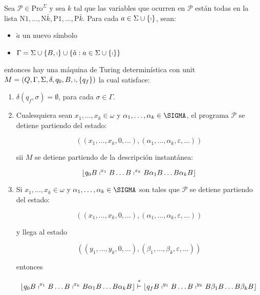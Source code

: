 	\begin{lemma}
		Sea $\mathcal{P}\in \mathrm{Pro}^{\Sigma }$ y sea $k$ tal que las variables que ocurren en $\mathcal{P}$ están todas
    en la lista $\mathrm{N}1, \dotsc, \mathrm{N}\bar{k}, \mathrm{P}1, \dotsc, \mathrm{P}\bar{k}$. Para cada $a \in
    \Sigma \cup \{\shortmid\}$, sean:

    \begin{itemize}
      \item $\tilde{a}$ un nuevo símbolo
      \item $\Gamma = \Sigma \cup \{B, \shortmid\} \cup \{\tilde{a}: a \in \Sigma \cup \{\shortmid\}\}$
    \end{itemize}

    \PN entonces hay una máquina de Turing determinística con unit $M = \left(Q, \Gamma, \Sigma, \delta, q_{0}, B,
    \shortmid, \{q_{f}\}\right)$ la cual satisface:

    \begin{enumerate}
      \item $\delta(q_{f}, \sigma) = \emptyset$, para cada $\sigma \in \Gamma$.
      \item Cualesquiera sean $x_{1}, \dotsc, x_{k} \in \omega$ y $\alpha_{1}, \dotsc, \alpha_{k} \in \SIGMA$, el
        programa $\mathcal{P}$ se detiene partiendo del estado:

        \[
          \left((x_{1}, \dotsc, x_{k}, 0, \dotsc), (\alpha_{1}, \dotsc, \alpha_{k}, \varepsilon,\dotsc)\right)
        \]

        \PN sii $M$ se detiene partiendo de la descripción instantánea:

        \[
          \lfloor q_{0} B \shortmid^{x_{1}} B \dotsc B \shortmid^{x_{k}} B \alpha_{1} B \dotsc B \alpha_{k} B \rfloor
        \]

      \item Si $x_{1}, \dotsc, x_{k} \in \omega$ y $\alpha_{1}, \dotsc, \alpha_{k} \in \SIGMA$ son tales que
        $\mathcal{P}$ se detiene partiendo del estado:

        \[
          \left((x_{1}, \dotsc, x_{k}, 0, \dotsc), (\alpha_{1}, \dotsc, \alpha_{k}, \varepsilon, \dotsc)\right)
        \]

        \PN y llega al estado

        \[
          \left((y_{1}, \dotsc, y_{k}, 0, \dotsc), (\beta_{1}, \dotsc, \beta_{k}, \varepsilon,\dotsc)\right)
        \]

        \PN entonces

        \[
          \lfloor q_{0} B \shortmid^{x_{1}} B \dotsc B \shortmid^{x_{k}} B \alpha_{1} B \dotsc B \alpha_{k} B \rfloor
          \overset {\ast}{\vdash} \lfloor q_{f} B \shortmid^{y_{1}} B \dotsc B \shortmid^{y_{k}} B \beta_{1} B \dotsc B
          \beta_{k} B \rfloor
        \]
    \end{enumerate}
  \end{lemma}
